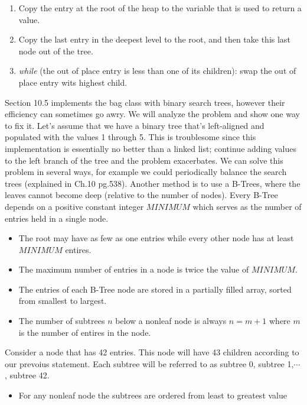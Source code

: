 \begin{enumerate}
\item Copy the entry at the root of the heap to the variable that is used to return a value.
\item Copy the last entry in the deepest level to the root, and then take this last node out of the tree.
\item \emph{while} (the out of place entry is less than one of its children): swap the out of place entry wits highest child.
\end{enumerate}

Section 10.5 implements the bag class with binary search trees, however their efficiency can sometimes go awry. We will analyze the problem and show one way to fix it.
Let's assume that we have a binary tree that's left-aligned and populated with the values 1 through 5. This is troublesome since this implementation is essentially no better than a linked list; continue adding values to the left branch of the tree and the problem exacerbates. We can solve this problem in several ways, for example we could periodically balance the search trees (explained in Ch.10 pg.538). Another method is to use a B-Trees, where the leaves cannot become deep (relative to the number of nodes).
Every B-Tree depends on a positive constant integer $MINIMUM$ which serves as the number of entries held in a single node.
\begin{itemize}
\item The root may have as few as one entries while every other node has at least $MINIMUM$ entires.
\item The maximum number of entries in a node is twice the value of $MINIMUM$.
\item The entries of each B-Tree node are stored in a partially filled array, sorted from smallest to largest.
\item The number of subtrees $n$ below a nonleaf node is always $n=m+1$ where $m$ is the number of entires in the node.
\end{itemize}
\begin{example}\label{example:numsubtrees}
Consider a node that has 42 entries. This node will have 43 children according to our prevoius statement. Each subtree will be referred to as subtree 0, subtree 1,$\cdots$, subtree 42.
\end{example}
\begin{itemize}
\item For any nonleaf node the subtrees are ordered from least to greatest value
\end{itemize}
